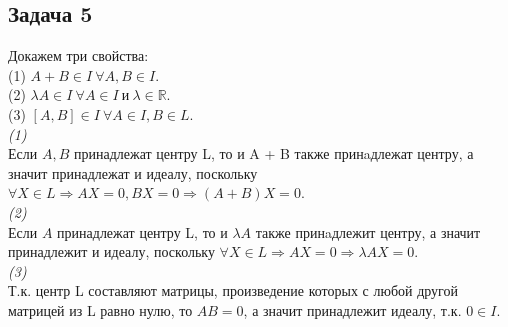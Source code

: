 	\subsection{Задача 5}
	Докажем три свойства: \\
	(1) $A+B \in I \ \forall A,B \in I$.\\
	(2) $\lambda A \in I \ \forall A \in I\  и\  \lambda \in \mathbb{R}$.\\
	(3) $[A,B] \in I \ \forall A \in I, B \in L$.\\
	\textit{(1)}\\
	Если $A, B$ принадлежат центру L, то и A + B также принaдлежат центру, а значит принадлежат и идеалу, поскольку $\forall X \in L \Rightarrow AX = 0, BX = 0 \Rightarrow (A+B)X = 0$.\\
	\textit{(2)}\\
	Если $A$ принадлежат центру L, то и $\lambda A$ также принaдлежит центру, а значит принадлежит и идеалу, поскольку $\forall X \in L \Rightarrow AX = 0 \Rightarrow \lambda AX = 0$. \\
	\textit{(3)}\\
	Т.к. центр L составляют матрицы, произведение которых с любой другой матрицей из L равно нулю, то $AB = 0$, а значит принадлежит  идеалу, т.к. $0 \in I$.\\\\\\\\\\\\\\\\\\
	
